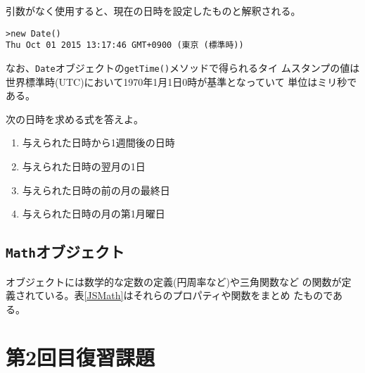 引数がなく使用すると、現在の日時を設定したものと解釈される。
\begin{Verbatim}
>new Date()
Thu Oct 01 2015 13:17:46 GMT+0900 (東京 (標準時))
\end{Verbatim}
なお、\Verb+Date+オブジェクトの\texttt{getTime()}メソッドで得られるタイ
ムスタンプの値は世界標準時(UTC)において1970年1月1日0時が基準となっていて
単位はミリ秒である。


\begin{Prob}\upshape\label{DateProb}
 次の日時を求める式を答えよ。
 \begin{enumerate}
	\item 与えられた日時から1週間後の日時
	\item 与えられた日時の翌月の1日
	\item 与えられた日時の前の月の最終日
	\item 与えられた日時の月の第1月曜日
 \end{enumerate}
\end{Prob}
\clearpage
\subsection{\protect\texttt{Math}オブジェクト}
オブジェクトには数学的な定数の定義(円周率など)や三角関数など
の関数が定義されている。表\ref{JSMath}はそれらのプロパティや関数をまとめ
たものである。

%
\clearpage
\section{第2回目復習課題}
%
\Answertrue

